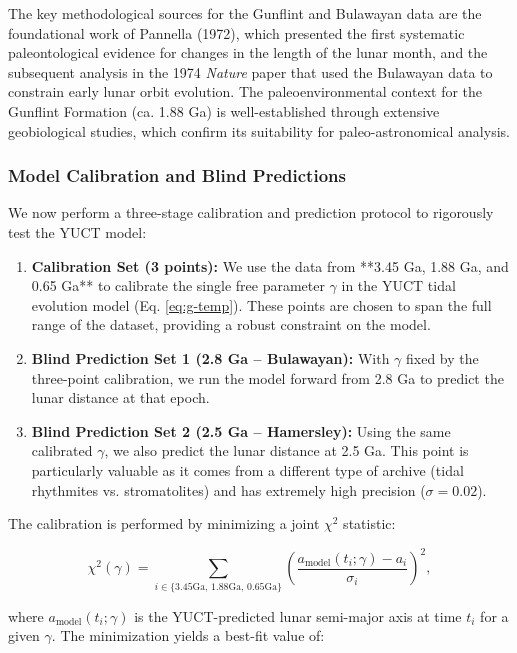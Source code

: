 \documentclass[12pt]{article}
\theoremstyle{remark}
\begin{document}
	The key methodological sources for the Gunflint and Bulawayan data are the foundational work of Pannella (1972), which presented the first systematic paleontological evidence for changes in the length of the lunar month, and the subsequent analysis in the 1974 \textit{Nature} paper \cite{Nature1974} that used the Bulawayan data to constrain early lunar orbit evolution. The paleoenvironmental context for the Gunflint Formation (ca. 1.88 Ga) is well-established through extensive geobiological studies, which confirm its suitability for paleo-astronomical analysis.
	
	\subsubsection{Model Calibration and Blind Predictions}
	\label{subsubsec:model-calibration}
	
	We now perform a three-stage calibration and prediction protocol to rigorously test the YUCT model:
	
	\begin{enumerate}
		\item \textbf{Calibration Set (3 points):} We use the data from **3.45 Ga, 1.88 Ga, and 0.65 Ga** to calibrate the single free parameter \(\gamma\) in the YUCT tidal evolution model (Eq. \ref{eq:g-temp}). These points are chosen to span the full range of the dataset, providing a robust constraint on the model.
		\item \textbf{Blind Prediction Set 1 (2.8 Ga – Bulawayan):} With \(\gamma\) fixed by the three-point calibration, we run the model forward from 2.8 Ga to predict the lunar distance at that epoch.
		\item \textbf{Blind Prediction Set 2 (2.5 Ga – Hamersley):} Using the same calibrated \(\gamma\), we also predict the lunar distance at 2.5 Ga. This point is particularly valuable as it comes from a different type of archive (tidal rhythmites vs. stromatolites) and has extremely high precision (\(\sigma = 0.02\)).
	\end{enumerate}
	
	The calibration is performed by minimizing a joint \(\chi^2\) statistic:
	
	\begin{equation}
		\chi^2(\gamma) = \sum_{i \in \{\text{3.45Ga, 1.88Ga, 0.65Ga}\}} \left( \frac{a_{\mathrm{model}}(t_i; \gamma) - a_i}{\sigma_i} \right)^2,
		\label{eq:chi2-five-point}
	\end{equation}
	
	where \(a_{\mathrm{model}}(t_i; \gamma)\) is the YUCT-predicted lunar semi-major axis at time \(t_i\) for a given \(\gamma\). The minimization yields a best-fit value of:
	
\end{document}
